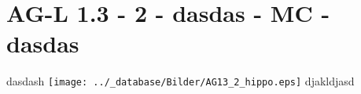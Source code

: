 \section{AG-L 1.3 - 2 - dasdas - MC - dasdas}

\begin{beispiel}[AG-L 1.3]{1}
dasdash \texttt{[image: ../\_database/Bilder/AG13\_2\_hippo.eps]} djakldjasd
\end{beispiel}